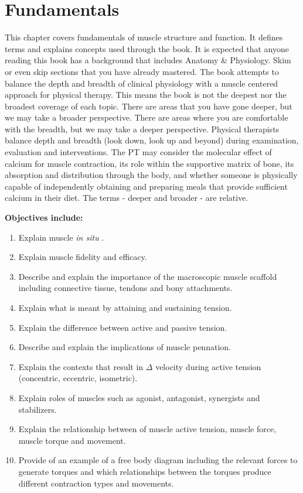 \chapter{Fundamentals}\label{chp:fundamentals}
\minitoc

This chapter covers fundamentals of muscle structure and function. It defines terms and explains concepts used through the book. It is expected that anyone reading this book has a background that includes Anatomy \& Physiology. Skim or even skip sections that you have already mastered. The book attempts to balance the depth and breadth of clinical physiology with a muscle centered approach for physical therapy. This means the book is not the deepest nor the broadest coverage of each topic. There are areas that you have gone deeper, but we may take a broader perspective. There are areas where you are comfortable with the breadth, but we may take a deeper perspective. Physical therapists balance depth and breadth (look down, look up and beyond) during examination, evaluation and interventions. The PT may consider the molecular effect of calcium for muscle contraction, its role within the supportive matrix of bone, its absorption and distribution through the body, and whether someone is physically capable of independently obtaining and preparing meals that provide sufficient calcium in their diet. The terms - deeper and broader - are relative.

\vspace{5mm}

\textbf{Objectives include:}
\begin{enumerate}
   \item Explain muscle \textit{in situ} .
   \item Explain muscle fidelity and efficacy. 
    \item Describe and explain the importance of the macroscopic muscle scaffold including connective tissue, tendons and bony attachments.
    \item Explain what is meant by attaining and sustaining tension.
    \item Explain the difference between active and passive tension.
    \item Describe and explain the implications of muscle pennation.
    \item Explain the contexts that result in $\Delta$ velocity during active tension (concentric, eccentric, isometric).
    \item Explain roles of muscles such as agonist, antagonist, synergists and stabilizers.
    \item Explain the relationship between of muscle active tension, muscle force, muscle torque and movement.
    \item Provide of an example of a free body diagram including the relevant forces to generate torques and which relationships between the torques produce different contraction types and movements.
\end{enumerate}

